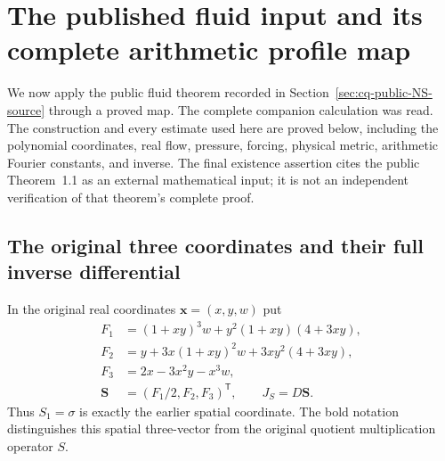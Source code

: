 \section{The published fluid input and its complete arithmetic profile map}
\label{sec:cq-NS-profile-transfer}

We now apply the public fluid theorem recorded in
Section~\ref{sec:cq-public-NS-source} through a proved map.
The complete companion calculation \cite{cqNSFlow} was read.
The construction and every estimate used here are proved below,
including the polynomial coordinates, real flow, pressure,
forcing, physical metric, arithmetic Fourier constants, and inverse.
The final existence assertion cites the public Theorem~1.1 as
an external mathematical input; it is not an independent
verification of that theorem's complete proof.

\subsection{The original three coordinates and their full inverse differential}

In the original real coordinates $\mathbf x=(x,y,w)$ put
\begin{equation}
\begin{aligned}
 F_1&=(1+xy)^3w+y^2(1+xy)(4+3xy),\\
 F_2&=y+3x(1+xy)^2w+3xy^2(4+3xy),\\
 F_3&=2x-3x^2y-x^3w,\\
 \mathbf S&=(F_1/2,F_2,F_3)^{\mathsf T},\qquad J_S=D\mathbf S .
\end{aligned}
\label{eq:cq-NS-original-S}
\end{equation}
Thus $S_1=\sigma$ is exactly the earlier spatial coordinate.
The bold notation distinguishes this spatial three-vector
from the original quotient multiplication operator $S$.

